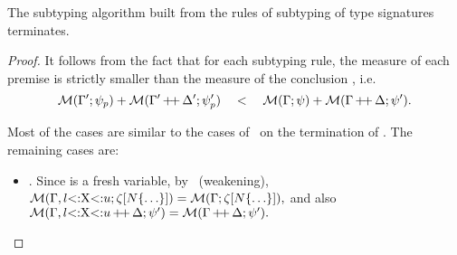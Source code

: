 \begin{theorem}%
\label{thm:subtysig-terminates}
    The subtyping algorithm built from the rules of
    subtyping of type signatures
     terminates.
\end{theorem}
\begin{proof}
    It follows from the fact that for each subtyping rule, 
    the measure of each premise 
    is strictly smaller than the measure 
    of the conclusion , i.e.
    \[\operatorname{\mathcal{M}}(\Gamma';\psi_p) + \operatorname{\mathcal{M}}(\Gamma'\operatorname{+\!+}\Delta';\psi'_p) \quad<\quad 
    \operatorname{\mathcal{M}}(\Gamma;\psi) + \operatorname{\mathcal{M}}(\Gamma\operatorname{+\!+}\Delta;\psi').\]

    Most of the cases are similar to the cases of~
    on the termination of .
    The remaining cases are:
    \begin{itemize}
        \item {}. Since \vx is a fresh variable,
            by~ (weakening),
            $\operatorname{\mathcal{M}}(\Gamma, l{\operatorname{<:}}\mathrm{X}{\operatorname{<:}}u;\zeta[N\{\ldots\}]) = 
            \operatorname{\mathcal{M}}(\Gamma;\zeta[N\{\ldots\}]),$ and also
            $\operatorname{\mathcal{M}}(\Gamma, l{\operatorname{<:}}\mathrm{X}{\operatorname{<:}}u\operatorname{+\!+}\Delta;\psi')
            = \operatorname{\mathcal{M}}(\Gamma\operatorname{+\!+}\Delta;\psi').$


\end{itemize}
\end{proof}
